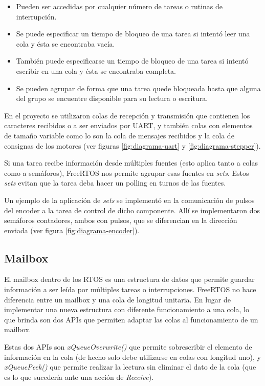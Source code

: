 \documentclass{IEEEtran}
\begin{document}
\begin{itemize}
    \item Pueden ser accedidas por cualquier número de tareas o rutinas de interrupción.
    \item Se puede especificar un tiempo de bloqueo de una tarea si intentó leer una cola y ésta se encontraba vacía.
    \item También puede especificarse un tiempo de bloqueo de una tarea si intentó escribir en una cola y ésta se encontraba completa.
    \item Se pueden agrupar de forma que una tarea quede bloqueada hasta que alguna del grupo se encuentre disponible para su lectura o escritura.
\end{itemize}

En el proyecto se utilizaron colas de recepción y transmisión que contienen los caracteres recibidos o a ser enviados por UART, y también colas con elementos de tamaño variable como lo son la cola de mensajes recibidos y la cola de consignas de los motores (ver figuras \ref{fig:diagrama-uart} y \ref{fig:diagrama-stepper}).

Si una tarea recibe información desde múltiples fuentes (esto aplica tanto a colas como a semáforos), FreeRTOS nos permite agrupar esas fuentes en \textit{sets}. Estos \textit{sets} evitan que la tarea deba hacer un polling en turnos de las fuentes.

Un ejemplo de la aplicación de \textit{sets} se implementó en la comunicación de pulsos del encoder a la tarea de control de dicho componente. Allí se implementaron dos semáforos contadores, ambos con pulsos, que se diferencian en la dirección enviada (ver figura \ref{fig:diagrama-encoder}).

\subsection{Mailbox}
El mailbox dentro de los RTOS es una estructura de datos que permite guardar información a ser leída por múltiples tareas o interrupciones. FreeRTOS no hace diferencia entre un mailbox y una cola de longitud unitaria. En lugar de implementar una nueva estructura con diferente funcionamiento a una cola, lo que brinda son dos APIs que permiten adaptar las colas al funcionamiento de un mailbox.

Estas dos APIs son \textit{xQueueOverwrite()} que permite sobrescribir el elemento de información en la cola (de hecho solo debe utilizarse en colas con longitud uno), y \textit{xQueuePeek()} que permite realizar la lectura sin eliminar el dato de la cola (que es lo que sucedería ante una acción de \textit{Receive}).
\end{document}
